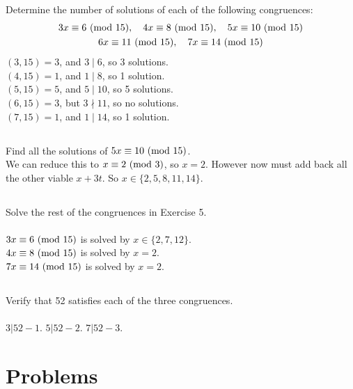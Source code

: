 \documentclass{article}
\begin{document}
\subsection{}
Determine the number of solutions of each of the following congruences:
\begin{gather*}
    3x \equiv 6 \ (\mathrm{mod}\ 15), \quad 4x \equiv 8 \ (\mathrm{mod}\ 15),
    \quad 5x \equiv 10 \ (\mathrm{mod}\ 15)\\
    6x \equiv 11 \ (\mathrm{mod}\ 15), \quad 7x \equiv 14 \ (\mathrm{mod}\ 15)
\end{gather*}
$(3, 15) = 3$, and $3 \mid 6$, so 3 solutions.\\
$(4, 15) = 1$, and $1 \mid 8$, so 1 solution.\\
$(5, 15) = 5$, and $5 \mid 10$, so 5 solutions.\\
$(6, 15) = 3$, but $3 \nmid 11$, so no solutions.\\
$(7, 15) = 1$, and $1 \mid 14$, so 1 solution.

\subsection{}
Find all the solutions of $5x \equiv 10 \ (\mathrm{mod}\ 15)$.\\
We can reduce this to $x \equiv 2 \ (\mathrm{mod}\ 3)$, so $x = 2$.
However now must add back all the other viable $x + 3t$.
So $x \in \{2, 5, 8, 11, 14\}$.

\subsection{}
Solve the rest of the congruences in Exercise 5.\\~\\
$3x \equiv 6 \ (\mathrm{mod}\ 15)$ is solved by $x \in \{2, 7, 12\}$.\\
$4x \equiv 8 \ (\mathrm{mod}\ 15)$ is solved by $x = 2$.\\
$7x \equiv 14 \ (\mathrm{mod}\ 15)$ is solved by $x = 2$.

\subsection{}
Verify that 52 satisfies each of the three congruences.\\~\\
$3|52 - 1$. $5|52 - 2$. $7|52 - 3$.

\section{Problems}
\end{document}
